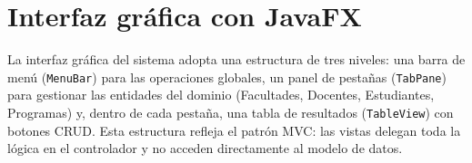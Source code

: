 \section{Interfaz gráfica con JavaFX}
\label{sec:java-javafx}

\noindent
La interfaz gráfica del sistema adopta una estructura de tres niveles: una barra
de menú (\texttt{MenuBar}) para las operaciones globales, un panel de pestañas
(\texttt{TabPane}) para gestionar las entidades del dominio (Facultades, Docentes,
Estudiantes, Programas) y, dentro de cada pestaña, una tabla de resultados
(\texttt{TableView}) con botones CRUD. Esta estructura refleja el patrón MVC:
las vistas delegan toda la lógica en el controlador y no acceden directamente
al modelo de datos.

